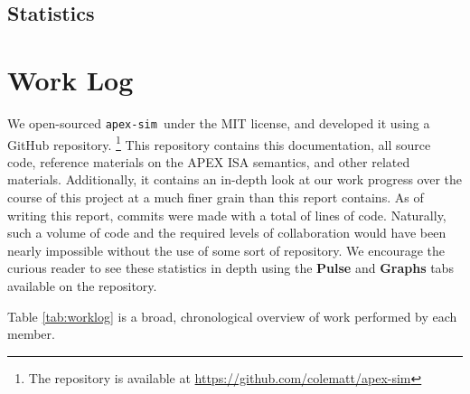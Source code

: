 \documentclass[12pt]{article}
\newcommand{\codename}[0]{\texttt{apex-sim}~}
\begin{document}
\subsection{Statistics}


\section{Work Log}
\label{sec:worklog}
We open-sourced \codename under the MIT license, and developed it using a GitHub repository. \footnote{The repository is available at \url{https://github.com/colematt/apex-sim}}
This repository contains this documentation, all source code, reference materials on the APEX ISA semantics, and other related materials.
Additionally, it contains an in-depth look at our work progress over the course of this project at a much finer grain than this report contains.
As of writing this report,  commits were made with a total of  lines of code.
Naturally, such a volume of code and the required levels of collaboration would have been nearly impossible without the use of some sort of repository.
We encourage the curious reader to see these statistics in depth using the \textbf{Pulse} and \textbf{Graphs} tabs available on the repository.

Table \ref{tab:worklog} is a broad, chronological overview of work performed by each member.
\end{document}
